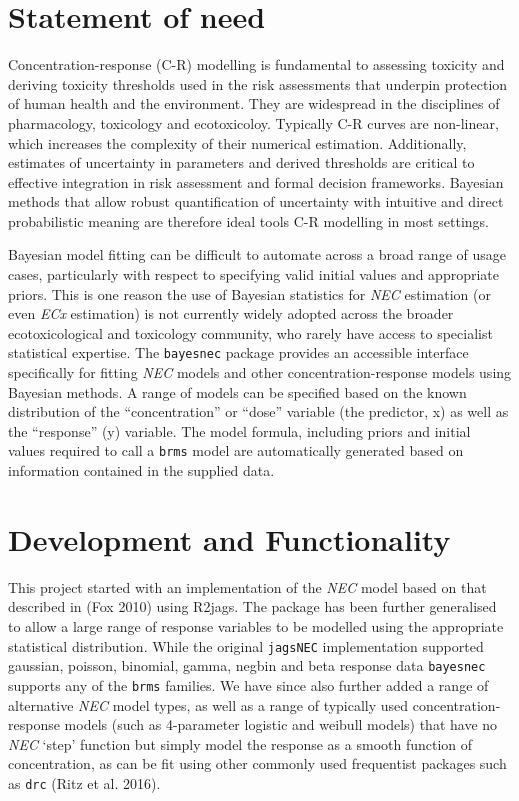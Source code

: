 \documentclass[10pt,a4paper,onecolumn]{article}
\begin{document}
\hypertarget{statement-of-need}{%
\section{Statement of need}\label{statement-of-need}}

Concentration-response (C-R) modelling is fundamental to assessing
toxicity and deriving toxicity thresholds used in the risk assessments
that underpin protection of human health and the environment. They are
widespread in the disciplines of pharmacology, toxicology and
ecotoxicoloy. Typically C-R curves are non-linear, which increases the
complexity of their numerical estimation. Additionally, estimates of
uncertainty in parameters and derived thresholds are critical to
effective integration in risk assessment and formal decision frameworks.
Bayesian methods that allow robust quantification of uncertainty with
intuitive and direct probabilistic meaning are therefore ideal tools C-R
modelling in most settings.

Bayesian model fitting can be difficult to automate across a broad range
of usage cases, particularly with respect to specifying valid initial
values and appropriate priors. This is one reason the use of Bayesian
statistics for \emph{NEC} estimation (or even \emph{ECx} estimation) is
not currently widely adopted across the broader ecotoxicological and
toxicology community, who rarely have access to specialist statistical
expertise. The \texttt{bayesnec} package provides an accessible
interface specifically for fitting \emph{NEC} models and other
concentration-response models using Bayesian methods. A range of models
can be specified based on the known distribution of the
``concentration'' or ``dose'' variable (the predictor, x) as well as the
``response'' (y) variable. The model formula, including priors and
initial values required to call a \texttt{brms} model are automatically
generated based on information contained in the supplied data.

\hypertarget{development-and-functionality}{%
\section{Development and
Functionality}\label{development-and-functionality}}

This project started with an implementation of the \emph{NEC} model
based on that described in (Fox 2010) using R2jags. The package has been
further generalised to allow a large range of response variables to be
modelled using the appropriate statistical distribution. While the
original \texttt{jagsNEC} implementation supported gaussian, poisson,
binomial, gamma, negbin and beta response data \texttt{bayesnec}
supports any of the \texttt{brms} families. We have since also further
added a range of alternative \emph{NEC} model types, as well as a range
of typically used concentration-response models (such as 4-parameter
logistic and weibull models) that have no \emph{NEC} `step' function but
simply model the response as a smooth function of concentration, as can
be fit using other commonly used frequentist packages such as
\texttt{drc} (Ritz et al. 2016).
\end{document}
